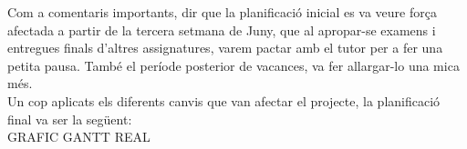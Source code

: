 Com a comentaris importants, dir que la planificació inicial es va veure força afectada a partir de la tercera setmana de Juny, que al apropar-se
examens i entregues finals d'altres assignatures, varem pactar amb el tutor per a fer una petita pausa. També el període posterior
de vacances, va fer allargar-lo una mica més. \\

Un cop aplicats els diferents canvis que van afectar el projecte, la planificació final va ser la següent: \\

GRAFIC GANTT REAL
